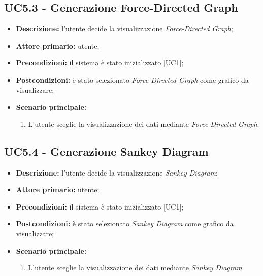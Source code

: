 \subsection{UC5.3 - Generazione Force-Directed Graph}
\begin{itemize}
    \item \textbf{Descrizione:} l'utente decide la visualizzazione \textit{Force-Directed Graph};
    \item \textbf{Attore primario:} utente;
    \item \textbf{Precondizioni:} il sistema è stato inizializzato [UC1];
    \item \textbf{Postcondizioni:} è stato selezionato \textit{Force-Directed Graph} come grafico da visualizzare;
    \item \textbf{Scenario principale:}
    \begin{enumerate}
      \item L'utente sceglie la visualizzazione dei dati mediante \textit{Force-Directed Graph}.
    \end{enumerate}
\end{itemize}

\subsection{UC5.4 - Generazione Sankey Diagram}
\begin{itemize}
    \item \textbf{Descrizione:} l'utente decide la visualizzazione \textit{Sankey Diagram};
    \item \textbf{Attore primario:} utente;
    \item \textbf{Precondizioni:} il sistema è stato inizializzato [UC1];
    \item \textbf{Postcondizioni:} è stato selezionato \textit{Sankey Diagram} come grafico da visualizzare;
    \item \textbf{Scenario principale:}
    \begin{enumerate}
      \item L'utente sceglie la visualizzazione dei dati mediante \textit{Sankey Diagram}.
    \end{enumerate}
\end{itemize}


